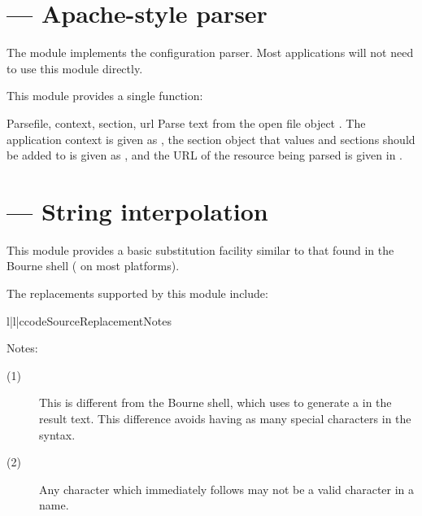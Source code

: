\documentclass{howto}
\begin{document}
\section{ --- Apache-style parser}


The  module implements the configuration
parser.  Most applications will not need to use this module directly.

This module provides a single function:

\begin{funcdesc}{Parse}{file, context, section, url}
  Parse text from the open file object .  The application
  context is given as , the section object that values
  and sections should be added to is given as , and the
  URL of the resource being parsed is given in .
\end{funcdesc}


\section{ --- String interpolation}


This module provides a basic substitution facility similar to that
found in the Bourne shell ( on most \UNIX{} platforms).  

The replacements supported by this module include:

\begin{tableiii}{l|l|c}{code}{Source}{Replacement}{Notes}
\end{tableiii}

\noindent
Notes:
\begin{description}
  \item[(1)]  This is different from the Bourne shell, which uses
              \code{\textbackslash\$} to generate a \character{\$} in
              the result text.  This difference avoids having as many
              special characters in the syntax.

  \item[(2)]  Any character which immediately follows  may
              not be a valid character in a name.
\end{description}
\end{document}
